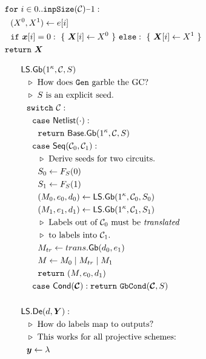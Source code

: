 \begin{figure}
\begin{adjustwidth}{-0.1\textwidth}{-0.1\textwidth}
\begin{minipage}[t]{0.56\linewidth}
\begin{align*}
      &~~\cfor~i \in 0..\inpsize(\cir)\minus 1:\\
      &~~~~(X^0, X^1) \gets e[i]\\
      &~~~~\cif~\cirinp[i] = 0:~\{~\gcirinp[i] \gets X^0~\}~\celse:~\{~\gcirinp[i] \gets X^1~\}\\
      &~~\creturn~\gcirinp
    \end{align*}
  \end{minipage}
  \begin{minipage}[t]{0.40\linewidth}
    \begin{align*}
      &\ourscheme.\gGb(1^\kappa, \cir, S)\\
      &~~\codecomment{How does \G garble the GC?}\\
      &~~\codecomment{$S$ is an explicit seed.}\\
      &~~\switch~\cir:\\
      &~~~~\ccase~\netlist(\cdot):\\
      &~~~~~~\creturn~\underscheme.\gGb(1^\kappa,\cir,S)\\
      &~~~~\ccase~\sequential(\cir_0, \cir_1):\\
      &~~~~~~\codecomment{Derive seeds for two circuits.}\\
      &~~~~~~S_0 \gets F_S(0)\\
      &~~~~~~S_1 \gets F_S(1)\\
      &~~~~~~(\mat_0, e_0, d_0) \gets \ourscheme.\gGb(1^\kappa,\cir_0, S_0)\\
      &~~~~~~(\mat_1, e_1, d_1) \gets \ourscheme.\gGb(1^\kappa,\cir_1, S_1)\\
      &~~~~~~\codecomment{Labels out of $\cir_0$ must be \emph{translated}}\\
      &~~~~~~\codecomment{to labels into $\cir_1$.}\\
      &~~~~~~\mat_{tr} \gets \gbtranslate(d_0,e_1)\\
      &~~~~~~\mat \gets \mat_0\mid \mat_{tr}\mid \mat_1\\
      &~~~~~~\creturn~(\mat, e_0, d_1)\\
      &~~~~\ccase~\conditional(\vec \cir): \creturn~\gbcond(\vec \cir, S)\\
      \\
      &\ourscheme.\gDe(d, \gcirout):\\
      &~~\codecomment{How do labels map to outputs?}\\
      &~~\codecomment{This works for all projective schemes:}\\
      &~~\cirout \gets \lambda\\

\end{align*}
\end{minipage}
\end{adjustwidth}
\end{figure}
